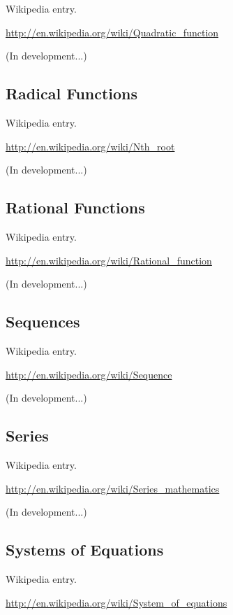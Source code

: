 \documentclass[12pt,oneside]{book}
\begin{document}
Wikipedia entry.

\href{http://en.wikipedia.org/wiki/Quadratic_function}{http://en.wikipedia.org/wiki/Quadratic\_function}

(In development...)

\subsection[Radical Functions]{Radical Functions}

Wikipedia entry.

\href{http://en.wikipedia.org/wiki/Nth_root}{http://en.wikipedia.org/wiki/Nth\_root}

(In development...)

\subsection[Rational Functions]{Rational Functions}

Wikipedia entry.

\href{http://en.wikipedia.org/wiki/Rational_function}{http://en.wikipedia.org/wiki/Rational\_function}

(In development...)

\subsection[Sequences]{Sequences}

Wikipedia entry.

\href{http://en.wikipedia.org/wiki/Sequence}{http://en.wikipedia.org/wiki/Sequence}

(In development...)

\subsection[Series]{Series}

Wikipedia entry.

\href{http://en.wikipedia.org/wiki/Series_mathematics}{http://en.wikipedia.org/wiki/Series\_mathematics}

(In development...)

\subsection[Systems of Equations]{Systems of Equations}

Wikipedia entry.

\href{http://en.wikipedia.org/wiki/System_of_equations}{http://en.wikipedia.org/wiki/System\_of\_equations}
\end{document}
